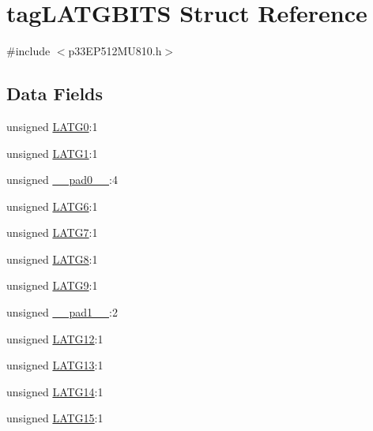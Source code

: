 \hypertarget{structtag_l_a_t_g_b_i_t_s}{}\section{tag\+L\+A\+T\+G\+B\+I\+TS Struct Reference}
\label{structtag_l_a_t_g_b_i_t_s}


{\ttfamily \#include $<$p33\+E\+P512\+M\+U810.\+h$>$}

\subsection*{Data Fields}
\begin{DoxyCompactItemize}
\item 
unsigned \hyperlink{structtag_l_a_t_g_b_i_t_s_ada17cac5982176a07551b63a28daf36f}{L\+A\+T\+G0}\+:1
\item 
unsigned \hyperlink{structtag_l_a_t_g_b_i_t_s_a909b7829f989c666382328b67dd8077a}{L\+A\+T\+G1}\+:1
\item 
unsigned \hyperlink{structtag_l_a_t_g_b_i_t_s_adf71f3d8410c1f1dbbc96680a92c49af}{\+\_\+\+\_\+pad0\+\_\+\+\_\+}\+:4
\item 
unsigned \hyperlink{structtag_l_a_t_g_b_i_t_s_a5f338ded36f3cd99a58bdd56ed06caf2}{L\+A\+T\+G6}\+:1
\item 
unsigned \hyperlink{structtag_l_a_t_g_b_i_t_s_a09bc15a3577d7f9b2c1de5545591af9e}{L\+A\+T\+G7}\+:1
\item 
unsigned \hyperlink{structtag_l_a_t_g_b_i_t_s_a79cfb9c5e7ee54529d10830dd6373e42}{L\+A\+T\+G8}\+:1
\item 
unsigned \hyperlink{structtag_l_a_t_g_b_i_t_s_a58344c9b18ea38762745edf0f5936b89}{L\+A\+T\+G9}\+:1
\item 
unsigned \hyperlink{structtag_l_a_t_g_b_i_t_s_acaf2d0924a107ec6e8d2e31febaf66f9}{\+\_\+\+\_\+pad1\+\_\+\+\_\+}\+:2
\item 
unsigned \hyperlink{structtag_l_a_t_g_b_i_t_s_a1bff0b190829da8fabf1efc73cdca658}{L\+A\+T\+G12}\+:1
\item 
unsigned \hyperlink{structtag_l_a_t_g_b_i_t_s_a00c852d54abcadb49db50dcc5f72e6c8}{L\+A\+T\+G13}\+:1
\item 
unsigned \hyperlink{structtag_l_a_t_g_b_i_t_s_aca7f7e87fb6db60af2e909515dcaa2c4}{L\+A\+T\+G14}\+:1
\item 
unsigned \hyperlink{structtag_l_a_t_g_b_i_t_s_a6adf791cc3ae7312658e038bafd74035}{L\+A\+T\+G15}\+:1
\end{DoxyCompactItemize}


